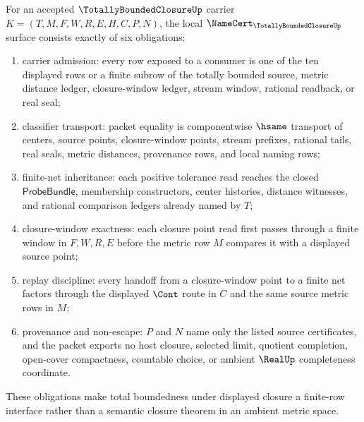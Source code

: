 \begin{theorem}
\label{thm:totally-bounded-closure-namecert-obligations}
For an accepted $\TotallyBoundedClosureUp$ carrier $K=(T,M,F,W,R,E,H,C,P,N)$, the local $\NameCert_{\TotallyBoundedClosureUp}$ surface consists exactly of six obligations:
\begin{enumerate}
\item carrier admission: every row exposed to a consumer is one of the ten displayed rows or a finite subrow of the totally bounded source, metric distance ledger, closure-window ledger, stream window, rational readback, or real seal;
\item classifier transport: packet equality is componentwise $\hsame$ transport of centers, source points, closure-window points, stream prefixes, rational tails, real seals, metric distances, provenance rows, and local naming rows;
\item finite-net inheritance: each positive tolerance read reaches the closed $\mathsf{ProbeBundle}$, membership constructors, center histories, distance witnesses, and rational comparison ledgers already named by $T$;
\item closure-window exactness: each closure point read first passes through a finite window in $F,W,R,E$ before the metric row $M$ compares it with a displayed source point;
\item replay discipline: every handoff from a closure-window point to a finite net factors through the displayed $\Cont$ route in $C$ and the same source metric rows in $M$;
\item provenance and non-escape: $P$ and $N$ name only the listed source certificates, and the packet exports no host closure, selected limit, quotient completion, open-cover compactness, countable choice, or ambient $\RealUp$ completeness coordinate.
\end{enumerate}
These obligations make total boundedness under displayed closure a finite-row interface rather than a semantic closure theorem in an ambient metric space.
\end{theorem}
